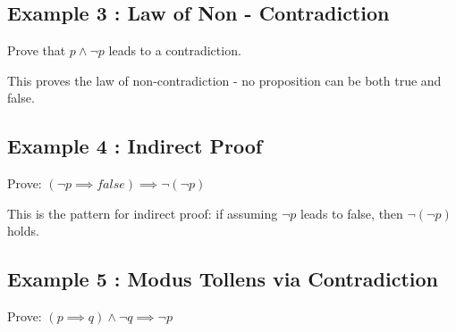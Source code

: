 \documentclass[a4paper,10pt,fleqn]{article}
\begin{document}
\subsection*{Example 3 : Law of Non - Contradiction}

\noindent Prove that $p \land \lnot p$ leads to a contradiction.

\bigskip

\begin{center}
\end{center}
\bigskip

\noindent This proves the law of non-contradiction - no proposition can be both true and false.

\bigskip

\subsection*{Example 4 : Indirect Proof}

\noindent Prove: $(\lnot p \implies false) \implies \lnot (\lnot p)$

\bigskip

\begin{center}
\end{center}
\bigskip

\noindent This is the pattern for indirect proof: if assuming $\lnot p$ leads to false, then $\lnot (\lnot p)$ holds.

\bigskip

\subsection*{Example 5 : Modus Tollens via Contradiction}

\noindent Prove: $(p \implies q) \land \lnot q \implies \lnot p$
\end{document}
